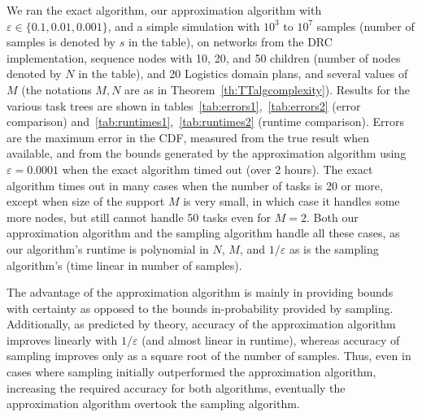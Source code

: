 \documentclass[review]{elsarticle}
\begin{document}
We ran the exact algorithm, our approximation algorithm with $\varepsilon \in \{ 0.1, 0.01, 0.001\}$, and a simple simulation with 
$10^3$ to $10^7$ samples (number of samples is denoted by $s$ in the table), on networks from the DRC
implementation, sequence nodes with 10, 20, and 50 children (number of nodes denoted by $N$ in the table), and 20 Logistics domain plans, and
several values of $M$ (the notations $M, N$ are as in Theorem~\ref{th:TTalgcomplexity}). 
Results for the various task trees are shown in tables~\ref{tab:errors1},~\ref{tab:errors2} (error comparison) and~\ref{tab:runtimes1},~\ref{tab:runtimes2} (runtime comparison).
Errors are the maximum error in the CDF, measured from the true result when available, and from the bounds generated by the approximation algorithm using $\varepsilon = 0.0001$
when the exact algorithm timed out (over 2 hours). 
The exact algorithm times out in many cases when the number of tasks is 20 or more, except when size of the support $M$ is very small, in which case it handles some more nodes, but still cannot handle 
50 tasks even for $M=2$.
Both our approximation algorithm and the sampling algorithm handle all these cases, as our algorithm's runtime is polynomial in $N$, $M$, and ${1}/{\varepsilon}$
as is the sampling algorithm's (time linear in number of samples). 

The advantage of the approximation algorithm is mainly in providing bounds with
certainty as opposed to the bounds in-probability provided by sampling. 
Additionally, as predicted by theory, accuracy of the approximation algorithm
improves linearly with ${1}/{\varepsilon}$ (and almost linear in runtime), whereas accuracy of sampling improves only as a square root of the number of
samples. Thus, even in cases where sampling initially outperformed the approximation algorithm, increasing the required accuracy for both algorithms,
eventually the approximation algorithm overtook the sampling algorithm.
\end{document}
